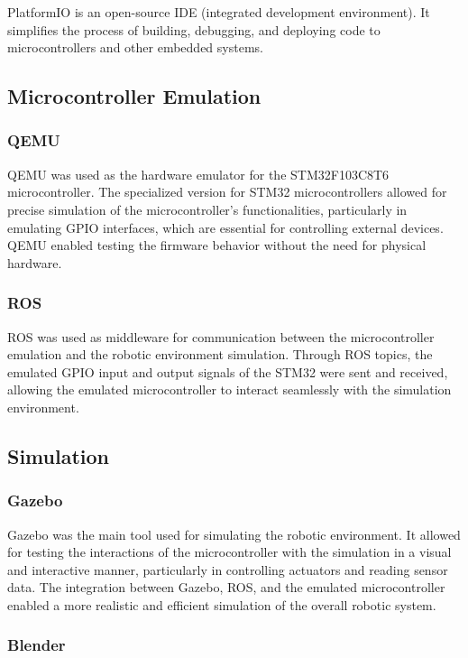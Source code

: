 \documentclass[../../monografia.tex]{subfiles}
\begin{document}
PlatformIO \cite{platformio_24} is an open-source IDE (integrated development environment). It simplifies the process of building, debugging, and deploying code to microcontrollers and other embedded systems.

\subsection{Microcontroller Emulation}
\subsubsection{QEMU}
QEMU \cite{QEMU_website_24} was used as the hardware emulator for the STM32F103C8T6 microcontroller. The specialized version for STM32 microcontrollers allowed for precise simulation of the microcontroller’s functionalities, particularly in emulating GPIO interfaces, which are essential for controlling external devices. QEMU enabled testing the firmware behavior without the need for physical hardware.

\subsubsection{ROS}

ROS \cite{ROS_website_24} was used as middleware for communication between the microcontroller emulation and the robotic environment simulation. Through ROS topics, the emulated GPIO input and output signals of the STM32 were sent and received, allowing the emulated microcontroller to interact seamlessly with the simulation environment.


\subsection{Simulation}
\subsubsection{Gazebo}

Gazebo was the main tool used for simulating the robotic environment. It allowed for testing the interactions of the microcontroller with the simulation in a visual and interactive manner, particularly in controlling actuators and reading sensor data. The integration between Gazebo, ROS, and the emulated microcontroller enabled a more realistic and efficient simulation of the overall robotic system.
\subsubsection{Blender}
\end{document}
